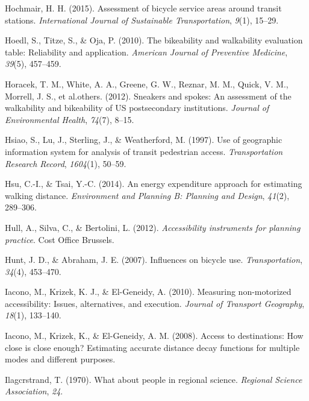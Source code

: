 \documentclass[12pt,twoside]{reedthesis}
\newlength{\cslhangindent}
\newenvironment{CSLReferences}[2] %
 {%
  \setlength{\parindent}{0pt}
  \ifodd #1 \everypar{\setlength{\hangindent}{\cslhangindent}}\ignorespaces\fi
  \ifnum #2 > 0
  \setlength{\parskip}{#2\baselineskip}
  \fi
 }%
 {}
\begin{document}
\begin{CSLReferences}{1}{0}
\leavevmode{}%
Hochmair, H. H. (2015). Assessment of bicycle service areas around transit stations. \emph{International Journal of Sustainable Transportation}, \emph{9}(1), 15--29.

\leavevmode{}%
Hoedl, S., Titze, S., \& Oja, P. (2010). The bikeability and walkability evaluation table: Reliability and application. \emph{American Journal of Preventive Medicine}, \emph{39}(5), 457--459.

\leavevmode{}%
Horacek, T. M., White, A. A., Greene, G. W., Reznar, M. M., Quick, V. M., Morrell, J. S., et al.others. (2012). Sneakers and spokes: An assessment of the walkability and bikeability of US postsecondary institutions. \emph{Journal of Environmental Health}, \emph{74}(7), 8--15.

\leavevmode{}%
Hsiao, S., Lu, J., Sterling, J., \& Weatherford, M. (1997). Use of geographic information system for analysis of transit pedestrian access. \emph{Transportation Research Record}, \emph{1604}(1), 50--59.

\leavevmode{}%
Hsu, C.-I., \& Tsai, Y.-C. (2014). An energy expenditure approach for estimating walking distance. \emph{Environment and Planning B: Planning and Design}, \emph{41}(2), 289--306.

\leavevmode{}%
Hull, A., Silva, C., \& Bertolini, L. (2012). \emph{Accessibility instruments for planning practice}. Cost Office Brussels.

\leavevmode{}%
Hunt, J. D., \& Abraham, J. E. (2007). Influences on bicycle use. \emph{Transportation}, \emph{34}(4), 453--470.

\leavevmode{}%
Iacono, M., Krizek, K. J., \& El-Geneidy, A. (2010). Measuring non-motorized accessibility: Issues, alternatives, and execution. \emph{Journal of Transport Geography}, \emph{18}(1), 133--140.

\leavevmode{}%
Iacono, M., Krizek, K., \& El-Geneidy, A. M. (2008). Access to destinations: How close is close enough? Estimating accurate distance decay functions for multiple modes and different purposes.

\leavevmode{}%
Ilagcrstrand, T. (1970). What about people in regional science. \emph{Regional Science Association}, \emph{24}.


\end{CSLReferences}
\end{document}

